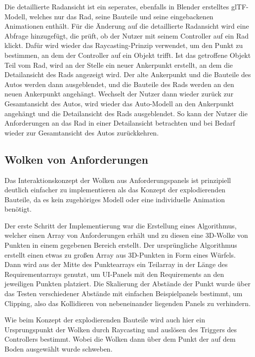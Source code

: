 Die detaillierte Radansicht ist ein seperates, ebenfalls in Blender erstelltes glTF-Modell, welches nur das Rad, seine Bauteile und seine eingebackenen Animationen enthält.
Für die Änderung auf die detaillierte Radansicht wird eine Abfrage hinzugefügt, die prüft, ob der Nutzer mit seinem Controller auf ein Rad klickt.
Dafür wird wieder das Raycasting-Prinzip verwendet, um den Punkt zu bestimmen, an dem der Controller auf ein Objekt trifft.
Ist das getroffene Objekt Teil vom Rad, wird an der Stelle ein neuer Ankerpunkt erstellt, an dem die Detailansicht des Rads angezeigt wird.
Der alte Ankerpunkt und die Bauteile des Autos werden dann ausgeblendet, und die Bauteile des Rads werden an den neuen Ankerpunkt angehängt.
Wechselt der Nutzer dann wieder zurück zur Gesamtansicht des Autos, wird wieder das Auto-Modell an den Ankerpunkt angehängt und die Detailansicht des Rads ausgeblendet.
So kann der Nutzer die Anforderungen an das Rad in einer Detailansicht betrachten und bei Bedarf wieder zur Gesamtansicht des Autos zurückkehren.





\subsection{Wolken von Anforderungen}

Das Interaktionskonzept der Wolken aus Anforderungspanels ist prinzipiell deutlich einfacher zu implementieren als das Konzept der explodierenden Bauteile, da es kein zugehöriges Modell oder eine individuelle Animation benötigt.

Der erste Schritt der Implementierung war die Erstellung eines Algorithmus, welcher einen Array von Anforderungen erhält und zu diesen eine 3D-Wolke von Punkten in einem gegebenen Bereich erstellt.
Der ursprüngliche Algorithmus erstellt einen etwas zu großen Array aus 3D-Punkten in Form eines Würfels.
Dann wird aus der Mitte des Punktearrays ein Teilarray in der Länge des Requirementarrays genutzt, um UI-Panels mit den Requirements an den jeweiligen Punkten platziert.
Die Skalierung der Abstände der Punkt wurde über das Testen verschiedener Abstände mit einfachen Beispielpanels bestimmt, um Clipping, also das Kollidieren von nebeneinander liegenden Panels zu verhindern.


Wie beim Konzept der explodierenden Bauteile wird auch hier ein Ursprungspunkt der Wolken durch Raycasting und auslösen des Triggers des Controllers bestimmt.
Wobei die Wolken dann über dem Punkt der auf dem Boden ausgewählt wurde schweben.


